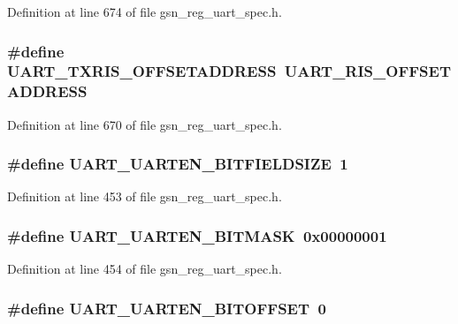 Definition at line 674 of file gsn\_\-reg\_\-uart\_\-spec.h.

\hypertarget{a00575_a546fb9ee3fbb804797b61e3c4377a4a8}{
\subsubsection[{UART\_\-TXRIS\_\-OFFSETADDRESS}]{\setlength{\rightskip}{0pt plus 5cm}\#define UART\_\-TXRIS\_\-OFFSETADDRESS~UART\_\-RIS\_\-OFFSETADDRESS}}
\label{a00575_a546fb9ee3fbb804797b61e3c4377a4a8}


Definition at line 670 of file gsn\_\-reg\_\-uart\_\-spec.h.

\hypertarget{a00575_ae0483dc5c6a23d0377094e1a6d942a6f}{
\subsubsection[{UART\_\-UARTEN\_\-BITFIELDSIZE}]{\setlength{\rightskip}{0pt plus 5cm}\#define UART\_\-UARTEN\_\-BITFIELDSIZE~1}}
\label{a00575_ae0483dc5c6a23d0377094e1a6d942a6f}


Definition at line 453 of file gsn\_\-reg\_\-uart\_\-spec.h.

\hypertarget{a00575_a9f93dee52d563740aa01c56f1ca02c99}{
\subsubsection[{UART\_\-UARTEN\_\-BITMASK}]{\setlength{\rightskip}{0pt plus 5cm}\#define UART\_\-UARTEN\_\-BITMASK~0x00000001}}
\label{a00575_a9f93dee52d563740aa01c56f1ca02c99}


Definition at line 454 of file gsn\_\-reg\_\-uart\_\-spec.h.

\hypertarget{a00575_a8d5076ebc577d12d7d2e13c1c558d4f2}{
\subsubsection[{UART\_\-UARTEN\_\-BITOFFSET}]{\setlength{\rightskip}{0pt plus 5cm}\#define UART\_\-UARTEN\_\-BITOFFSET~0}}
\label{a00575_a8d5076ebc577d12d7d2e13c1c558d4f2}


